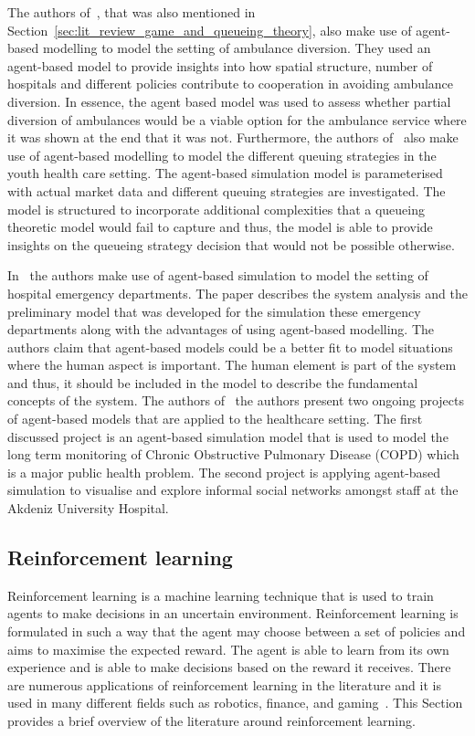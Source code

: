The authors of~\cite{hagtvedt2009cooperative}, that was also mentioned in
Section~\ref{sec:lit_review_game_and_queueing_theory}, also make use of
agent-based modelling to model the setting of ambulance diversion. 
They used an agent-based model to provide insights into how spatial structure,
number of hospitals and different policies contribute to cooperation in
avoiding ambulance diversion.
In essence, the agent based model was used to assess whether partial diversion
of ambulances would be a viable option for the ambulance service where it
was shown at the end that it was not.
Furthermore, the authors of~\cite{Giesen2009} also make use of agent-based
modelling to model the different queuing strategies in the youth health care
setting.
The agent-based simulation model is parameterised with actual market data and
different queuing strategies are investigated.
The model is structured to incorporate additional complexities that a queueing
theoretic model would fail to capture and thus, the model is able to provide
insights on the queueing strategy decision that would not be possible
otherwise.

In~\cite{Stainsby2009536} the authors make use of agent-based simulation to
model the setting of hospital emergency departments.
The paper describes the system analysis and the preliminary model that was
developed for the simulation these emergency departments along with the
advantages of using agent-based modelling.
The authors claim that agent-based models could be a better fit to model
situations where the human aspect is important.
The human element is part of the system and thus, it should be included in the
model to describe the fundamental concepts of the system.
The authors of~\cite{Bilge2006699} the authors present two ongoing projects of
agent-based models that are applied to the healthcare setting.
The first discussed project is an agent-based simulation model that is used to
model the long term monitoring of Chronic Obstructive Pulmonary Disease (COPD)
which is a major public health problem.
The second project is applying agent-based simulation to visualise and explore
informal social networks amongst staff at the Akdeniz University Hospital.




\subsection{Reinforcement learning}

Reinforcement learning is a machine learning technique that is used to
train agents to make decisions in an uncertain environment.
Reinforcement learning is formulated in such a way that the agent may choose
between a set of policies and aims to maximise the expected reward.
The agent is able to learn from its own experience and is able to make
decisions based on the reward it receives.
There are numerous applications of reinforcement learning in the literature
and it is used in many different fields such as robotics, finance, and
gaming~\cite{sutton2018reinforcement}.
This Section provides a brief overview of the literature around reinforcement
learning.

